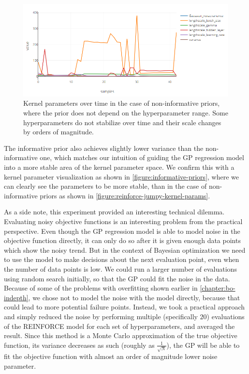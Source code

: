 \begin{figure}
	\begin{center}
		\includegraphics[width=1.0\textwidth]{images/reinforce-jumpy-kernel-params.png}
		\caption{Kernel parameters over time in the case of non-informative priors, where the prior does not depend on the hyperparameter range. Some hyperparameters do not stabilize over time and their scale changes by orders of magnitude.}
		\label{figure:reinforce-jumpy-kernel-params}
	\end{center}
\end{figure}


The informative prior also achieves slightly lower variance than the non-informative one, which matches our intuition of guiding the GP regression model into a more stable area of the kernel parameter space. We confirm this with a kernel parameter visualization as shown in \autoref{figure:informative-priors}, where we can clearly see the parameters to be more stable, than in the case of non-informative priors as shown in \autoref{figure:reinforce-jumpy-kernel-params}.

As a side note, this experiment provided an interesting technical dilemma. Evaluating noisy objective functions is an interesting problem from the practical perspective. Even though the GP regression model is able to model noise in the objective function directly, it can only do so after it is given enough data points which show the noisy trend. But in the context of Bayesian optimization we need to use the model to make decisions about the next evaluation point, even when the number of data points is low. We could run a larger number of evaluations using random search initially, so that the GP could fit the noise in the data. Because of some of the problems with overfitting shown earlier in \autoref{chapter:bo-indepth}, we chose not to model the noise with the model directly, because that could lead to more potential failure points. Instead, we took a practical approach and simply reduced the noise by performing multiple (specifically $20$) evaluations of the REINFORCE model for each set of hyperparameters, and averaged the result. Since this method is a Monte Carlo approximation of the true objective function, its variance decreases as such (roughly as $\frac{1}{\sqrt{N}}$), the GP will be able to fit the objective function with almost an order of magnitude lower noise parameter.


